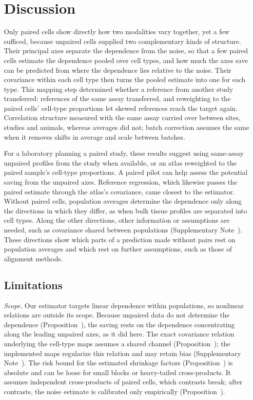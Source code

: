 \documentclass[pdflatex,sn-vancouver-num,iicol]{sn-jnl}
\begin{document}
\section{Discussion}
Only paired cells show directly how two modalities vary together, yet a few sufficed, because unpaired cells supplied two complementary kinds of structure. Their principal axes separate the dependence from the noise, so that a few paired cells estimate the dependence pooled over cell types, and how much the axes save can be predicted from where the dependence lies relative to the noise. Their covariance within each cell type then turns the pooled estimate into one for each type. This mapping step determined whether a reference from another study transferred: references of the same assay transferred, and reweighting to the paired cells' cell-type proportions let skewed references reach the target again. Correlation structure measured with the same assay carried over between sites, studies and animals, whereas averages did not; batch correction assumes the same when it removes shifts in average and scale between batches\cite{johnson2007,korsunsky2019}.

For a laboratory planning a paired study, these results suggest using same-assay unpaired profiles from the study when available, or an atlas reweighted to the paired sample's cell-type proportions. A paired pilot can help assess the potential saving from the unpaired axes. Reference regression, which likewise passes the paired estimate through the atlas's covariance, came closest to the estimator. Without paired cells, population averages determine the dependence only along the directions in which they differ, as when bulk tissue profiles are separated into cell types\cite{newman2019}. Along the other directions, other information or assumptions are needed, such as covariance shared between populations (Supplementary Note~). These directions show which parts of a prediction made without pairs rest on population averages and which rest on further assumptions, such as those of alignment methods\cite{welch2019,cao2022,demetci2022}.

\subsection*{Limitations}
\textit{Scope.} Our estimator targets linear dependence within populations, so nonlinear relations are outside its scope. Because unpaired data do not determine the dependence (Proposition~), the saving rests on the dependence concentrating along the leading unpaired axes, as it did here. The exact covariance relation underlying the cell-type maps assumes a shared channel (Proposition~); the implemented maps regularize this relation and may retain bias (Supplementary Note~). The risk bound for the estimated shrinkage factors (Proposition~) is absolute and can be loose for small blocks or heavy-tailed cross-products. It assumes independent cross-products of paired cells, which contrasts break; after contrasts, the noise estimate is calibrated only empirically (Proposition~).
\end{document}
